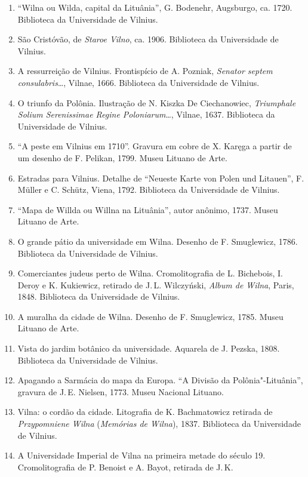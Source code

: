 \begin{enumerate}
{  Descriptio}\ldots{}, Cracóvia, 1578. Biblioteca da Universidade de
  Vilnius.
\item
  ``Wilna ou Wilda, capital da Lituânia'', G. Bodenehr, Augsburgo, ca.
  1720. Biblioteca da Universidade de Vilnius.
\item
  São Cristóvão, de \emph{Staroe Vilno}, ca. 1906. Biblioteca da
  Universidade de Vilnius.
\item
  A ressurreição de Vilnius. Frontispício de A. Pozniak, \emph{Senator
  septem consulabris}\ldots{}, Vilnae, 1666. Biblioteca da Universidade
  de Vilnius.
\item
  O triunfo da Polônia. Ilustração de N. Kiszka De Ciechanowiec,
  \emph{Triumphale Solium Serenissimae Regine Poloniarum}\ldots{},
  Vilnae, 1637. Biblioteca da Universidade de Vilnius.
\item
  ``A peste em Vilnius em 1710''. Gravura em cobre de X. Karęga a partir
  de um desenho de F. Pelikan, 1799. Museu Lituano de Arte.
\item
  Estradas para Vilnius. Detalhe de ``Neueste Karte von Polen und
  Litauen'', F. Müller e C. Schütz, Viena, 1792. Biblioteca da
  Universidade de Vilnius.
\item
  ``Mapa de Willda ou Willna na Lituânia'', autor anônimo, 1737. Museu
  Lituano de Arte.
\item
  O grande pátio da universidade em Wilna. Desenho de F. Smuglewicz,
  1786. Biblioteca da Universidade de Vilnius.
\item
  Comerciantes judeus perto de Wilna. Cromolitografia de L. Bichebois,
  I. Deroy e K. Kukiewicz, retirado de J.\,L. Wilczyński, \emph{Album de
  Wilna}, Paris, 1848. Biblioteca da Universidade de Vilnius.
\item
  A muralha da cidade de Wilna. Desenho de F. Smuglewicz, 1785. Museu
  Lituano de Arte.
\item
  Vista do jardim botânico da universidade. Aquarela de J. Pezska, 1808.
  Biblioteca da Universidade de Vilnius.
\item
  Apagando a Sarmácia do mapa da Europa. ``A Divisão da
  Polônia"-Lituânia'', gravura de J.\,E. Nielsen, 1773. Museu Nacional
  Lituano.
\item
  Vilna: o cordão da cidade. Litografia de K. Bachmatowicz retirada de
  \emph{Przypomniene Wilna} (\emph{Memórias de Wilna}), 1837. Biblioteca
  da Universidade de Vilnius.
\item
  A Universidade Imperial de Vilna na primeira metade do século 19.
  Cromolitografia de P. Benoist e A. Bayot, retirada de J.\,K.

\end{enumerate}
